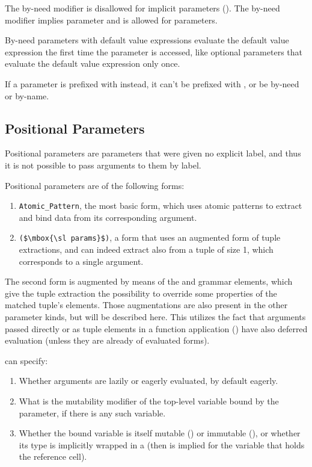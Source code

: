 The by-need modifier is disallowed for implicit parameters (). The by-need modifier implies  parameter and is allowed for  parameters. 

By-need parameters with default value expressions evaluate the default value expression the first time the parameter is accessed, like optional parameters that evaluate the default value expression only once. 

If a parameter is prefixed with  instead, it can't be prefixed with , or be by-need or by-name. 





\subsection{Positional Parameters}
\label{sec:positional-parameters}

Positional parameters are parameters that were given no explicit label, and thus it is not possible to pass arguments to them by label. %

Positional parameters are of the following forms:
\begin{enumerate}
  \item \lstinline!Atomic_Pattern!, the most basic form, which uses atomic patterns to extract and bind data from its corresponding argument. 
  \item \lstinline!($\mbox{\sl params}$)!, a form that uses an augmented form of tuple extractions, and can indeed extract also from a tuple of size 1, which corresponds to a single argument. 
\end{enumerate}

The second form is augmented by means of the  and  grammar elements, which give the tuple extraction the possibility to override some properties of the matched tuple's elements. Those augmentations are also present in the other parameter kinds, but will be described here. This utilizes the fact that arguments passed directly or as tuple elements in a function application () have also deferred evaluation (unless they are already of evaluated forms). 

 can specify:
\begin{enumerate}
  \item Whether arguments are lazily or eagerly evaluated, by default eagerly. 
  \item What is the mutability modifier of the top-level variable bound by the parameter, if there is any such variable. 
  \item Whether the bound variable is itself mutable () or immutable (), or whether its type is implicitly wrapped in a  (then  is implied for the variable that holds the reference cell). 
\end{enumerate}

